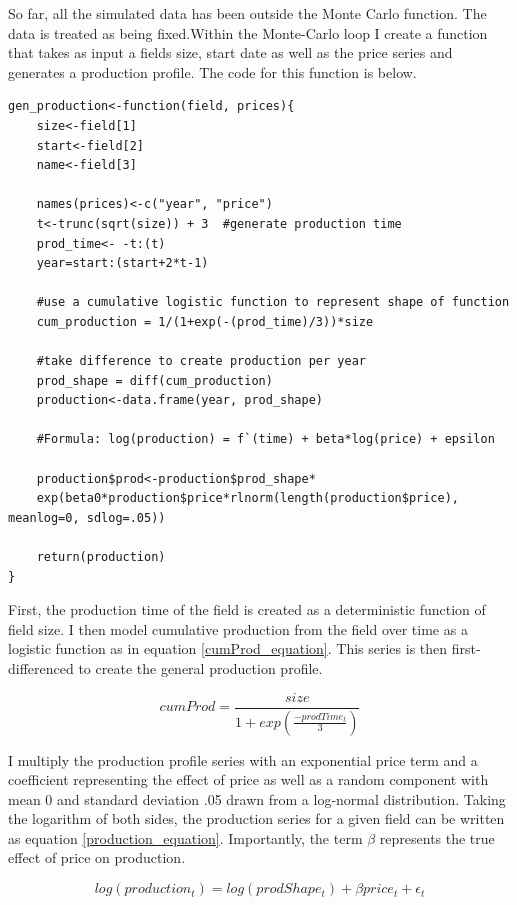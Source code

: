 \documentclass[12pt]{article}
\begin{document}
So far, all the simulated data has been outside the Monte Carlo function.  The data is treated as being fixed.Within the Monte-Carlo loop I create a function that takes as input a fields size, start date as well as the price series and generates a production profile.  The code for this function is below.  

\begin{verbatim}
gen_production<-function(field, prices){
	size<-field[1]
	start<-field[2]
	name<-field[3]

	names(prices)<-c("year", "price")
	t<-trunc(sqrt(size)) + 3  #generate production time
	prod_time<- -t:(t)
	year=start:(start+2*t-1)

	#use a cumulative logistic function to represent shape of function
	cum_production = 1/(1+exp(-(prod_time)/3))*size

	#take difference to create production per year
	prod_shape = diff(cum_production)
	production<-data.frame(year, prod_shape)
	
	#Formula: log(production) = f`(time) + beta*log(price) + epsilon
	
	production$prod<-production$prod_shape*
	exp(beta0*production$price*rlnorm(length(production$price), meanlog=0, sdlog=.05))

	return(production)
}
\end{verbatim}

First, the production time of the field is created as a deterministic function of field size.  I then model cumulative production from the field over time as a logistic function as in equation \ref{cumProd_equation}.  This series is then first-differenced to create the general production profile.  

\begin{equation}
cumProd=\frac{size}{1+exp(\frac{-prodTime_t}{3})}
\label{cumProd_equation}

\end{equation}

I multiply the production profile series with an exponential price term and a coefficient representing the effect of price as well as a random component with mean 0 and standard deviation .05 drawn from a log-normal distribution.  Taking the logarithm of both sides, the production series for a given field can be written as equation \ref{production_equation}.  Importantly, the term $\beta$ represents the true effect of price on production.  

\begin{equation}
log(production_t)=log(prodShape_t) + \beta price_t + \epsilon_t
\label{production_equation}
\end{equation}
\end{document}
